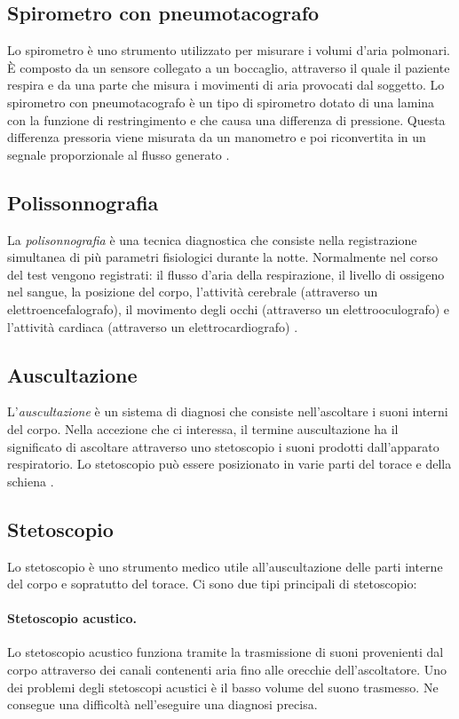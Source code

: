 \subsection{Spirometro con pneumotacografo}
Lo spirometro \`e uno strumento utilizzato per misurare i volumi d'aria polmonari. \`E composto da un sensore collegato a un boccaglio, attraverso il quale il paziente respira e da una parte che misura i movimenti di aria provocati dal soggetto. 
Lo spirometro con pneumotacografo \`e un tipo di spirometro dotato di una lamina con la funzione di restringimento e che causa una differenza di pressione. 
Questa differenza pressoria viene misurata da un manometro e poi riconvertita in un segnale proporzionale al flusso generato \cite{WikiSpirPneu, PneumotacofragoTreCani}.

\subsection{Polissonnografia}
La \emph{polisonnografia} \`e una tecnica diagnostica che consiste nella registrazione simultanea di pi\`u parametri fisiologici durante la notte. Normalmente nel corso del test vengono registrati: il flusso d'aria della respirazione, il livello di ossigeno nel sangue, la posizione del corpo, l'attivit\`a cerebrale (attraverso un elettroencefalografo), il movimento degli occhi (attraverso un elettrooculografo) e l'attivit\`a cardiaca (attraverso un elettrocardiografo) \cite{polisonnografo}.

\subsection{Auscultazione}
L'\emph{auscultazione} \`e un sistema di diagnosi che consiste nell'ascoltare i suoni interni del corpo.
Nella accezione che ci interessa, il termine auscultazione ha il significato di ascoltare attraverso uno stetoscopio i suoni prodotti dall'apparato respiratorio. Lo stetoscopio pu\`o essere posizionato in varie parti del torace e della schiena \cite{CARPDWAM}. 

\subsection{Stetoscopio}

Lo stetoscopio
\`e uno strumento medico utile all'auscultazione delle parti interne del corpo e sopratutto del torace. Ci sono due tipi principali di stetoscopio:
\paragraph{Stetoscopio acustico.}
    Lo stetoscopio acustico funziona tramite la trasmissione di suoni provenienti dal corpo attraverso dei canali contenenti aria fino alle orecchie dell'ascoltatore.
    Uno dei problemi degli stetoscopi acustici \`e il basso volume del suono trasmesso. 
    Ne consegue una difficolt\`a nell'eseguire una diagnosi precisa.
